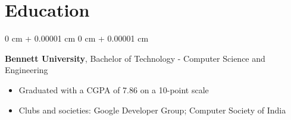 \documentclass[10pt, a4paper]{article}
\newenvironment{highlights}{ \begin{itemize}[ topsep=0.10 cm, parsep=0.10 cm, partopsep=0pt,
itemsep=0pt, leftmargin=0 cm + 10pt ] }{ \end{itemize} } %
\newenvironment{onecolentry}{ \begin{adjustwidth}{ 0 cm + 0.00001 cm }{ 0 cm + 0.00001 cm }
}{ \end{adjustwidth} } %
\begin{document}
	\section{Education}
	\begin{onecolentry}
		\textbf{Bennett University}, Bachelor of Technology - Computer
		Science and Engineering
		\begin{highlights}
			\item Graduated with a CGPA of 7.86 on a 10-point scale
			\item Clubs and societies: Google Developer Group; Computer Society of India
		\end{highlights}
	\end{onecolentry}
\end{document}
